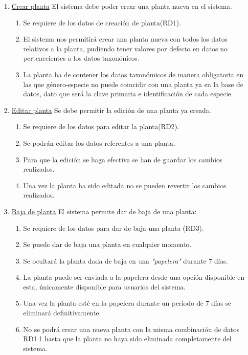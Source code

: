 \documentclass[10pt,a4paper]{article}
\begin{document}
\bigskip

\begin{enumerate}[label=RF\arabic*. ,leftmargin=2.8\parindent]
	\item \underline{Crear planta}
	 \newline 
	 \newline
	El sistema debe poder crear una planta nueva en el sistema.
	\begin{enumerate}[label=-]
	
		\item Se requiere de los datos de creación de planta(RD1).
		\item El sistema nos permitirá crear una planta nueva con todos los datos relativos a la planta, pudiendo tener valores por defecto en datos no pertenecientes a los datos taxonónicos.
		\item La planta ha de contener los datos taxonómicos de manera obligatoria en las que género-especie no puede coincidir con una planta ya en la base de datos, dato que será la clave primaria e identificación de cada especie.
		
	\end{enumerate}

	\bigskip
	\item \underline{Editar planta}
	\newline \newline
	Se debe permitir la edición de una planta ya creada.
	\begin{enumerate}[label=-]
	\item Se requiere de los datos para editar la planta(RD2).
		\item Se podrán editar los datos referentes a una planta.
		\item Para que la edición se haga efectiva se han de guardar los cambios realizados.
		\item Una vez la planta ha sido editada no se pueden revertir los cambios realizados.

		
	\end{enumerate}

	\bigskip
	\item \underline{Baja de planta}
	\newline \newline
	El sistema permite dar de baja de una planta:
	\begin{enumerate}[label=-]
		\item Se requiere de los datos para dar de baja una planta (RD3).
		\item Se puede dar de baja una planta en cualquier momento.
		\item Se ocultará la planta dada de baja en una \textit{"papelera"} durante 7 días.
		\item La planta puede ser enviada a la papelera desde una opción disponible en esta, únicamente disponible para usuarios del sistema.		
		\item Una vez la planta esté en la papelera durante un período de 7 días se eliminará definitivamente.
		\item No se podrá crear una nueva planta con la misma combinación de datos RD1.1 hasta que la planta no haya sido eliminada completamente del sistema.
	\end{enumerate}


\end{enumerate}
\end{document}
